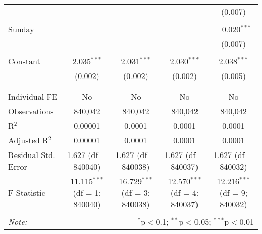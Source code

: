 \documentclass[
]{article}
\begin{document}
\begin{table}[!htbp]
{\begin{tabular}{@{\extracolsep{5pt}}lcccc}
  &  &  &  & (0.007) \\ 
  & & & & \\ 
 Sunday &  &  &  & $-$0.020$^{***}$ \\ 
  &  &  &  & (0.007) \\ 
  & & & & \\ 
 Constant & 2.035$^{***}$ & 2.031$^{***}$ & 2.030$^{***}$ & 2.038$^{***}$ \\ 
  & (0.002) & (0.002) & (0.002) & (0.005) \\ 
  & & & & \\ 
\hline \\[-1.8ex] 
Individual FE & No & No & No & No \\ 
Observations & 840,042 & 840,042 & 840,042 & 840,042 \\ 
R$^{2}$ & 0.00001 & 0.0001 & 0.0001 & 0.0001 \\ 
Adjusted R$^{2}$ & 0.00001 & 0.0001 & 0.0001 & 0.0001 \\ 
Residual Std. Error & 1.627 (df = 840040) & 1.627 (df = 840038) & 1.627 (df = 840037) & 1.627 (df = 840032) \\ 
F Statistic & 11.115$^{***}$ (df = 1; 840040) & 16.729$^{***}$ (df = 3; 840038) & 12.570$^{***}$ (df = 4; 840037) & 12.216$^{***}$ (df = 9; 840032) \\ 
\hline 
\hline \\[-1.8ex] 
\textit{Note:}  & \multicolumn{4}{r}{$^{*}$p$<$0.1; $^{**}$p$<$0.05; $^{***}$p$<$0.01} \\ 
\end{tabular}
} 
\end{table} 
\newpage
\end{document}
